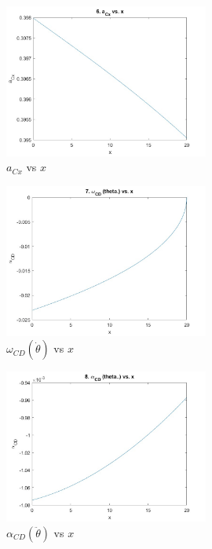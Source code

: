 \documentclass[12pt, a4paper]{article}
\begin{document}
\FloatBarrier

\begin{figure}[htbp]
    \centering
    \includegraphics[width=0.6\textwidth]{graph6.jpg}
    \caption{$a_{Cx}$ vs $x$}
    \label{fig:label2}
\end{figure}

\FloatBarrier

\begin{figure}[htbp]
    \centering
    \includegraphics[width=0.6\textwidth]{graph7.jpg}
    \caption{$\omega_{CD} (\dot\theta)$ vs $x$}
    \label{fig:label2}
\end{figure}

\FloatBarrier

\begin{figure}[htbp]
    \centering
    \includegraphics[width=0.6\textwidth]{graph8.jpg}
    \caption{$\alpha_{CD} (\ddot\theta)$ vs $x$}
    \label{fig:label2}
\end{figure}

\FloatBarrier
\end{document}
